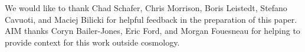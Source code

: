 \documentclass[\docopts]{\docclass}
\begin{document}


We would like to thank Chad Schafer, Chris Morrison, Boris Leistedt, Stefano 
Cavuoti, and Maciej Bilicki for helpful feedback in the preparation of this 
paper.
AIM thanks Coryn Bailer-Jones, Eric Ford, and Morgan Fouesneau for helping to 
provide context for this work outside cosmology.





\end{document}
